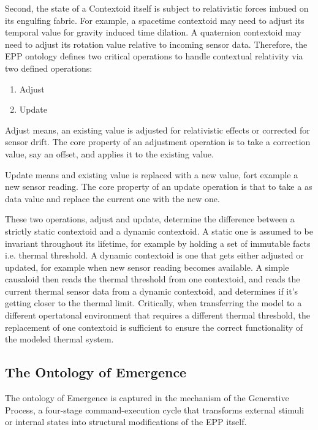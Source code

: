 Second, the state of a Contextoid itself is subject to relativistic forces imbued on its engulfing fabric. For example, a spacetime contextoid may need to adjust its temporal value for  gravity induced time dilation. A quaternion contextoid may need to adjust its rotation value relative to incoming sensor data. Therefore, the EPP ontology defines two critical operations to handle contextual relativity via two defined operations:

\begin{enumerate}
	\item Adjust
	\item Update
\end{enumerate}

Adjust means, an existing value is adjusted for relativistic effects or corrected for sensor drift. The core property of an adjustment operation is to take a correction value, say an offset, and applies it to the existing value. 

Update means and existing value is replaced with a new value, fort example a new sensor reading. The core property of an update operation is that to take a as data value and replace the current one with the new one. 

These two operations, adjust and update, determine the difference between a strictly static contextoid and a dynamic contextoid. A static one is assumed to be invariant throughout its lifetime, for example by holding a set of immutable facts i.e. thermal threshold. A dynamic contextoid is one that gets either adjusted or updated, for example when new sensor reading becomes available. A simple causaloid then reads the thermal threshold from one contextoid, and reads the current thermal sensor data from a dynamic contextoid, and determines if it’s getting closer to the thermal limit. Critically, when transferring the model to a different opertatonal environment that requires a different thermal threshold, the replacement of one contextoid is sufficient to ensure the correct functionality of the modeled thermal system.  

\subsection{The Ontology of Emergence}
\label{sec:ontology_emergence}

The ontology of Emergence is captured in the mechanism of the Generative Process, a four-stage command-execution cycle that transforms external stimuli or internal states into structural modifications of the EPP itself. 

